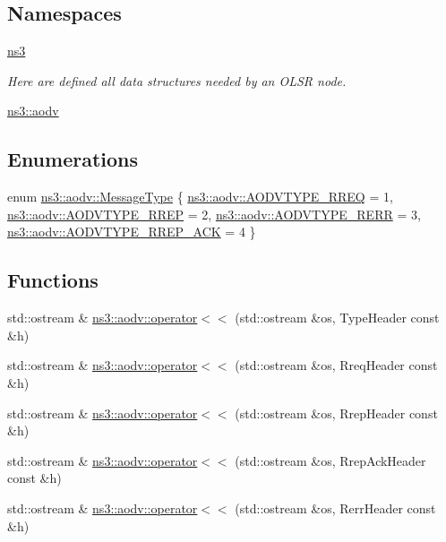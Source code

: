 \subsection*{Namespaces}
\begin{DoxyCompactItemize}
\item 
 \hyperlink{namespacens3}{ns3}
\begin{DoxyCompactList}\small\item\em Here are defined all data structures needed by an O\+L\+SR node. \end{DoxyCompactList}\item 
 \hyperlink{namespacens3_1_1aodv}{ns3\+::aodv}
\end{DoxyCompactItemize}
\subsection*{Enumerations}
\begin{DoxyCompactItemize}
\item 
enum \hyperlink{namespacens3_1_1aodv_a8cf417608302ba0ed75225c976944d44}{ns3\+::aodv\+::\+Message\+Type} \{ \hyperlink{namespacens3_1_1aodv_a8cf417608302ba0ed75225c976944d44ad5f62dc18635d788b1a5b0dd834d46f0}{ns3\+::aodv\+::\+A\+O\+D\+V\+T\+Y\+P\+E\+\_\+\+R\+R\+EQ} = 1, 
\hyperlink{namespacens3_1_1aodv_a8cf417608302ba0ed75225c976944d44a034af3d66c569436a630b5ee35399e45}{ns3\+::aodv\+::\+A\+O\+D\+V\+T\+Y\+P\+E\+\_\+\+R\+R\+EP} = 2, 
\hyperlink{namespacens3_1_1aodv_a8cf417608302ba0ed75225c976944d44a363aea0c29a02f5899cf088654c6d844}{ns3\+::aodv\+::\+A\+O\+D\+V\+T\+Y\+P\+E\+\_\+\+R\+E\+RR} = 3, 
\hyperlink{namespacens3_1_1aodv_a8cf417608302ba0ed75225c976944d44a1bd445a537508666f448cc9f5a16f6a8}{ns3\+::aodv\+::\+A\+O\+D\+V\+T\+Y\+P\+E\+\_\+\+R\+R\+E\+P\+\_\+\+A\+CK} = 4
 \}
\end{DoxyCompactItemize}
\subsection*{Functions}
\begin{DoxyCompactItemize}
\item 
std\+::ostream \& \hyperlink{namespacens3_1_1aodv_a90ef9ec7b33676a188a27d37e74b8d44}{ns3\+::aodv\+::operator$<$$<$} (std\+::ostream \&os, Type\+Header const \&h)
\item 
std\+::ostream \& \hyperlink{namespacens3_1_1aodv_a3d3e78cc63ed6b8026c97501e54b2cf4}{ns3\+::aodv\+::operator$<$$<$} (std\+::ostream \&os, Rreq\+Header const \&h)
\item 
std\+::ostream \& \hyperlink{namespacens3_1_1aodv_a7d52512b5bc6196c6eabcb26ca9102e2}{ns3\+::aodv\+::operator$<$$<$} (std\+::ostream \&os, Rrep\+Header const \&h)
\item 
std\+::ostream \& \hyperlink{namespacens3_1_1aodv_a26d242a58b2d7ebe77bfff59c5ce75b1}{ns3\+::aodv\+::operator$<$$<$} (std\+::ostream \&os, Rrep\+Ack\+Header const \&h)
\item 
std\+::ostream \& \hyperlink{namespacens3_1_1aodv_a1954bbce17a97f6c7f499343302714d8}{ns3\+::aodv\+::operator$<$$<$} (std\+::ostream \&os, Rerr\+Header const \&h)
\end{DoxyCompactItemize}
